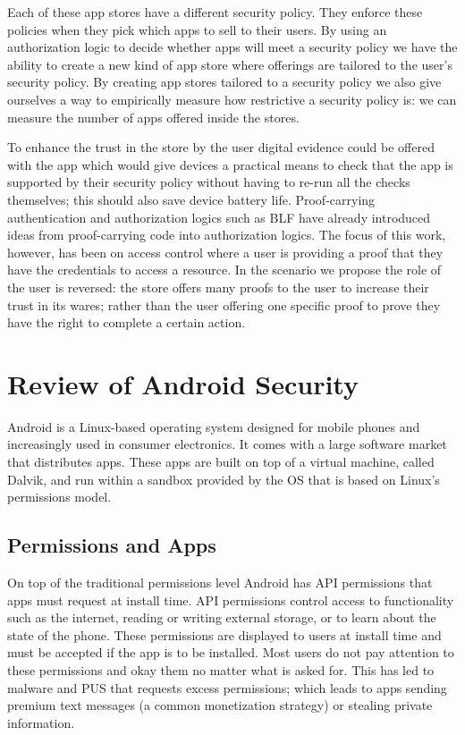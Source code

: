 \documentclass[a4paper]{article}
\begin{document}
Each of these app stores have a different security policy.  They enforce these
policies when they pick which apps to sell to their users.  By using an
authorization logic to decide whether apps will meet a security policy we have
the ability to create a new kind of app store where offerings are tailored to
the user's security policy.  By creating app stores tailored to a security
policy we also give ourselves a way to empirically measure how restrictive a
security policy is: we can measure the number of apps offered inside the stores.

To enhance the trust in the store by the user digital evidence could be offered
with the app which would give devices a practical means to check that the app is
supported by their security policy without having to re-run all the checks
themselves; this should also save device battery life.  Proof-carrying
authentication\cite{Appel:1999dq} and authorization logics such as
BLF\cite{Whitehead:2004bu} have already introduced ideas from proof-carrying
code into authorization logics. The focus of this work, however, has been on
access control where a user is providing a proof that they have the credentials
to access a resource.   In the scenario we propose the role of the user is
reversed: the store offers many proofs to the user to increase their trust in
its wares; rather than the user offering one specific proof to prove they have
the right to complete a certain action.

\section{Review of Android Security}

Android is a Linux-based operating system designed for mobile phones and
increasingly used in consumer electronics. It comes with a large software
market that distributes apps. These apps are built on top of a virtual machine,
called Dalvik, and run within a sandbox provided by the OS that is based on
Linux's permissions model\cite{Drake:2014uq}.

\subsection{Permissions and Apps}

On top of the traditional permissions level Android has API permissions that
apps must request at install time. API permissions control access to
functionality such as the internet, reading or writing external storage, or to
learn about the state of the phone. These permissions are displayed to users at
install time and must be accepted if the app is to be installed. Most users do
not pay attention to these permissions and okay them no matter what is asked
for\cite{Felt:2012hm}. This has led to malware and \ac{PUS} that requests
excess permissions; which leads to apps sending premium text messages (a common
monetization strategy\cite{Chien:2011vw}) or stealing private information.
\end{document}
